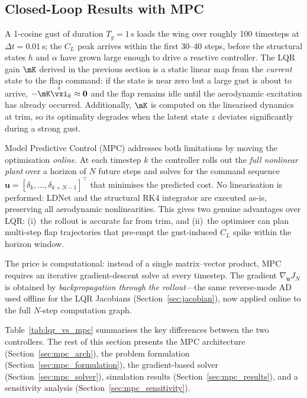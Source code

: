 
\subsection{Closed-Loop Results with MPC}
\label{sec:mpc}

A 1-cosine gust of duration $T_g = 1\,\text{s}$ loads the wing over roughly
100 timesteps at $\Delta t = 0.01\,\text{s}$; the $C_L$ peak arrives within
the first 30--40 steps, before the structural states $h$ and $\alpha$ have
grown large enough to drive a reactive controller.
The LQR gain $\mK$ derived in the previous section is a static linear map from
the \emph{current} state to the flap command: if the state is near zero but a
large gust is about to arrive, $-\mK\hat{\tilde{\vxi}}_k \approx \mathbf{0}$
and the flap remains idle until the aerodynamic excitation has already occurred.
Additionally, $\mK$ is computed on the linearised dynamics at trim, so its
optimality degrades when the latent state $z$ deviates significantly during a
strong gust.

Model Predictive Control (MPC) addresses both limitations by moving the
optimisation \emph{online}.
At each timestep $k$ the controller rolls out the \emph{full nonlinear plant}
over a horizon of $N$ future steps and solves for the command sequence
$\mathbf{u} = [\delta_k,\ldots,\delta_{k+N-1}]^\top$ that minimises the
predicted cost.
No linearisation is performed: LDNet and the structural RK4 integrator are
executed as-is, preserving all aerodynamic nonlinearities.
This gives two genuine advantages over LQR: (i)~the rollout is accurate far
from trim, and (ii)~the optimiser can plan multi-step flap trajectories that
pre-empt the gust-induced $C_L$ spike within the horizon window.

The price is computational: instead of a single matrix--vector product, MPC
requires an iterative gradient-descent solve at every timestep.
The gradient $\nabla_{\mathbf{u}} J_N$ is obtained by
\emph{backpropagation through the rollout}---the same reverse-mode AD used
offline for the LQR Jacobians (Section~\ref{sec:jacobian}), now applied
online to the full $N$-step computation graph.

Table~\ref{tab:lqr_vs_mpc} summarises the key differences between the two
controllers.
The rest of this section presents the MPC architecture
(Section~\ref{sec:mpc_arch}), the problem formulation
(Section~\ref{sec:mpc_formulation}), the gradient-based solver
(Section~\ref{sec:mpc_solver}), simulation results
(Section~\ref{sec:mpc_results}), and a sensitivity analysis
(Section~\ref{sec:mpc_sensitivity}).

